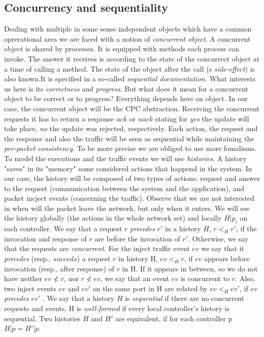 \documentclass{article}
\begin{document}
\subsection{Concurrency and sequentiality}
Dealing with multiple in some sense independent objects which have a common oprerational area we are faced with a notion of \emph{concurrent object}. A concurrent object is shared by processes. It is equipped with methods each process can invoke. The answer it receives is according to the state of the concurrect object at a time of calling a method. The state of the object after the call (s \emph{side-effect}) is also known.It is specified in a so-called \emph{sequential documentation.} What interests us here is its \emph{correctness} and \emph{progress}. But what does it mean for a concurrent object to be correct or to progress? Everything depends here on object.
In our case, the concurrent object will be the CPC abstraction. Receiving the concurrent requests it has to return a response $ack$ or $nack$ stating for \emph{yes} the update will take place, \emph{no} the update was rejected, respectively. Each action, the request and the response and also the traffic will be seen as sequential while maintaining the \emph{per-packet consistency}.
To be more precise we are obliged to use more fomalisms.
To model the executions and the traffic events we will use \emph{histories}. A history "saves" in its "memory" some considered actions that happend in the system. In our case, the history will be composed of two types of actions: request and  answer to the request (communication between the system and the application), and packet incject events (concerning the traffic). Observe that we are not interested in when will the packet leave the network, but only when it enters.
We will see the history globally (the actions in the whole network set) and locally $H|p_i$ on each controller.
We say that a request $r$ \emph{precedes} $r'$ in a history $H$, $r<_Hr'$, if the invocation and response of $r$ are before the invocation of $r'$. Otherwise, we say that the requests are \emph{concurrent}. For the inject traffic event $ev$ we say that it \emph{precedes} (resp., $succeds$) a request $r$ in history H, $ev<_H r$, if $ev$ appears before invocation (resp., after response)  of $r$ in H. If it appears in between, so we do not have neither $ev\nless r$, nor $r\nless ev$, we say that an event $ev$ is concurrent to $r$. Also, two inject events $ev$ and $ev'$ on the same port in H are related by $ev<_Hev'$, if $ev$ \emph{precedes} $ev'$ \cite{CKLS15}.
We say that a history $H$ is \emph{sequential} if there are no concurrent requests and events. H is \emph{well-formed} if every local controller's history is sequential. Two histories $H$ and $H'$ are equivalent, if for each controller p $H|p = H'|p$. 
\end{document}
